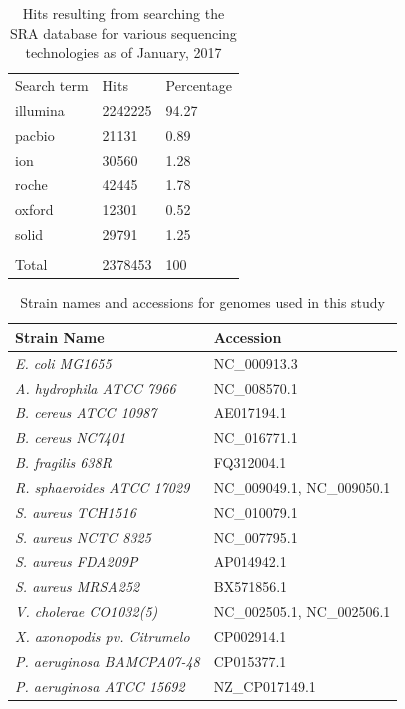 \documentclass[11pt]{article}
\begin{document}
\begin{table}[]
\centering
\caption{Hits resulting from searching the SRA database for various sequencing technologies as of January, 2017}
\label{searchterms}
\begin{tabular}{lll}
Search term & Hits & Percentage \\
illumina & 2242225 & 94.27 \\
pacbio & 21131 & 0.89 \\
ion & 30560 & 1.28 \\
roche & 42445 & 1.78 \\
oxford & 12301 & 0.52 \\
solid & 29791 & 1.25 \\
 &  &  \\
Total & 2378453 & 100
\end{tabular}
\end{table}


\begin{table}[]
\centering
\caption{Strain names and accessions for genomes used in this study}
\label{strainlist}
\begin{tabular}{ll}
  Strain Name & Accession \\
  \hline
  \textit{E. coli MG1655} & NC\_000913.3 \\
  \textit{A. hydrophila ATCC 7966} & NC\_008570.1 \\
  \textit{B. cereus ATCC 10987} & AE017194.1 \\
  \textit{B. cereus NC7401} & NC\_016771.1 \\
  \textit{B. fragilis 638R} & FQ312004.1 \\
  \textit{R. sphaeroides ATCC 17029} & NC\_009049.1, NC\_009050.1 \\
  \textit{S. aureus TCH1516} & NC\_010079.1 \\
  \textit{S. aureus NCTC 8325} & NC\_007795.1 \\
  \textit{S. aureus FDA209P} & AP014942.1 \\
  \textit{S. aureus MRSA252} & BX571856.1 \\
  \textit{V. cholerae CO1032(5)} & NC\_002505.1, NC\_002506.1 \\
  \textit{X. axonopodis pv. Citrumelo} & CP002914.1 \\
  \textit{P. aeruginosa BAMCPA07-48} & CP015377.1 \\
  \textit{P. aeruginosa ATCC 15692} & NZ\_CP017149.1
\end{tabular}
\end{table}
\end{document}
